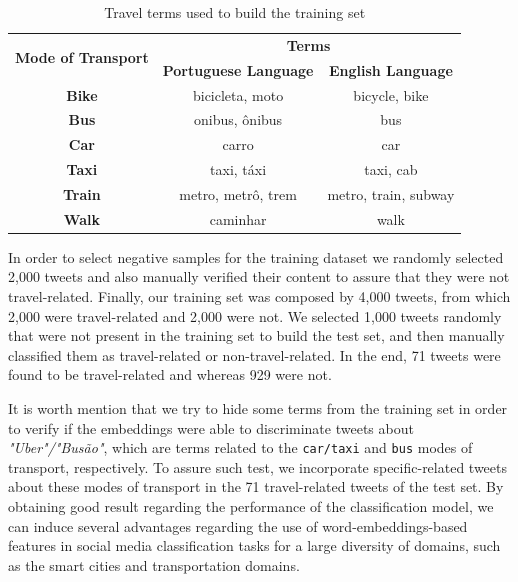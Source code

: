 \begin{table}[htbp]
	\centering
	\small
	\caption{Travel terms used to build the training set}
	\label{tab:terms}
	\begin{tabular}{c|c|c}
		\hline
		\multirow{2}{*}{\textbf{Mode of Transport}} & \multicolumn{2}{c}{\textbf{Terms}} \\ \cline{2-3} 
		& \multicolumn{1}{l|}{\textbf{Portuguese Language}} & \textbf{English Language} \\ \hline
		\textbf{Bike} & bicicleta, moto & bicycle, bike \\
		\textbf{Bus} & onibus, ônibus & bus \\
		\textbf{Car} & carro & car \\
		\textbf{Taxi} & taxi, táxi & taxi, cab \\
		\textbf{Train} & metro, metrô, trem & metro, train, subway \\
		\textbf{Walk} & caminhar & walk \\ \hline
	\end{tabular}
\end{table}

In order to select negative samples for the training dataset we randomly selected 2,000 tweets and also manually verified their content to assure that they were not travel-related. Finally, our training set was composed by 4,000 tweets, from which 2,000 were travel-related and 2,000 were not. 
We selected 1,000 tweets randomly that were not present in the training set to build the test set, and then manually classified them as travel-related or non-travel-related. In the end, 71 tweets were found to be travel-related and whereas 929 were not.

It is worth mention that we try to hide some terms from the training set in order to verify if the embeddings were able to discriminate tweets about \emph{"Uber"/"Busão"}, which are terms related to the \texttt{car/taxi} and \texttt{bus} modes of transport, respectively. To assure such test, we incorporate specific-related tweets about these modes of transport in the 71 travel-related tweets of the test set. By obtaining good result regarding the performance of the classification model, we can induce several advantages regarding the use of word-embeddings-based features in social media classification tasks for a large diversity of domains, such as the smart cities and transportation domains.

